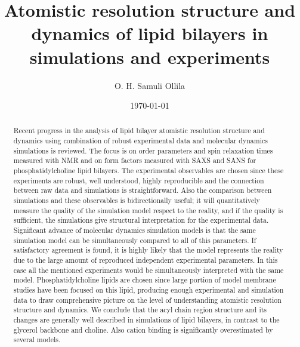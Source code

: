 \documentclass[aps,prl,superscriptaddress,twocolumn]{revtex4}
\begin{document}

\title{Atomistic resolution structure and dynamics of lipid bilayers in simulations and experiments} %



\author{O. H. Samuli Ollila}



\date{\today}

\begin{abstract}
Recent progress in the analysis of lipid bilayer atomistic resolution structure and dynamics
using combination of robust experimental data and molecular dynamics simulations is reviewed.
The focus is on order parameters and spin relaxation times measured with NMR and on form factors
measured with SAXS and SANS for phosphatidylcholine lipid bilayers. The experimental observables
are chosen since these experiments are robust, well understood, highly reproducible and the connection
between raw data and simulations is straightforward. Also the comparison between simulations
and these observables is bidirectionally useful; it will quantitatively measure the quality 
of the simulation model respect to the reality, and if the quality is sufficient, the simulations
give structural interpretation for the experimental data. Significant advance of molecular dynamics
simulation models is that the same simulation model can be simultaneously compared to all of
this parameters. If satisfactory agreement is found, it is highly likely that the model
represents the reality due to the large amount of reproduced independent experimental parameters. 
In this case all the mentioned experiments would be simultaneously interpreted with the same model.
Phosphatidylcholine lipids are chosen since large portion of model membrane studies have been 
focused on this lipid, producing enough experimental and simulation data to draw comprehensive
picture on the level of understanding atomistic resolution structure and dynamics.
We conclude that the acyl chain region structure and its changes are generally well described in simulations of lipid bilayers, 
in contrast to the glycerol backbone and choline. Also cation binding is significantly overestimated
by several models.

\end{abstract}
\end{document}
